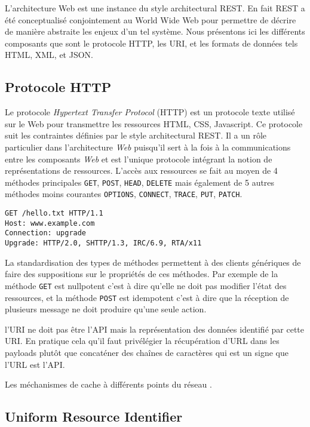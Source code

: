 \documentclass[a4paper, 11pt]{report}
\begin{document}
L'architecture Web est une instance du style architectural REST.  En
fait REST a été conceptualisé conjointement au World Wide Web pour
permettre de décrire de manière abstraite les enjeux d'un tel système.
Nous présentons ici les différents composants que sont le protocole
HTTP, les URI, et les formats de données tels HTML, XML, et JSON.

\subsection{Protocole HTTP}

Le protocole \emph{Hypertext Transfer Protocol} (HTTP) est un
protocole texte utilisé sur le Web pour transmettre les ressources
HTML, CSS, Javascript.  Ce protocole suit les contraintes définies par
le style architectural REST.  Il a un rôle particulier dans
l'architecture \emph{Web} puisqu'il sert à la fois à la communications
entre les composants \emph{Web} et est l'unique protocole intégrant la
notion de représentations de ressources.  L'accès aux ressources se
fait au moyen de 4 méthodes principales \verb=GET=, \verb=POST=,
\verb=HEAD=, \verb=DELETE= mais également de 5 autres méthodes moins
courantes \verb=OPTIONS=, \verb=CONNECT=, \verb=TRACE=, \verb=PUT=,
\verb=PATCH=.

\begin{verbatim}
GET /hello.txt HTTP/1.1
Host: www.example.com
Connection: upgrade
Upgrade: HTTP/2.0, SHTTP/1.3, IRC/6.9, RTA/x11
\end{verbatim}

La standardisation des types de méthodes permettent à des clients
génériques de faire des suppositions sur le propriétés de ces
méthodes.  Par exemple de la méthode \verb=GET= est nullpotent c'est à
dire qu'elle ne doit pas modifier l'état des ressources, et la méthode
\verb=POST= est idempotent c'est à dire que la réception de plusieurs
message ne doit produire qu'une seule action.

l'URI ne doit pas être l'API mais la représentation des données
identifié par cette URI.  En pratique cela qu'il faut privélégier la
récupération d'URL dans les payloads plutôt que concaténer des chaînes
de caractères qui est un signe que l'URL est l'API.

Les méchanismes de cache à différents points du réseau
\cite{fielding1999hypertext}.

\subsection{Uniform Resource Identifier}
\end{document}
